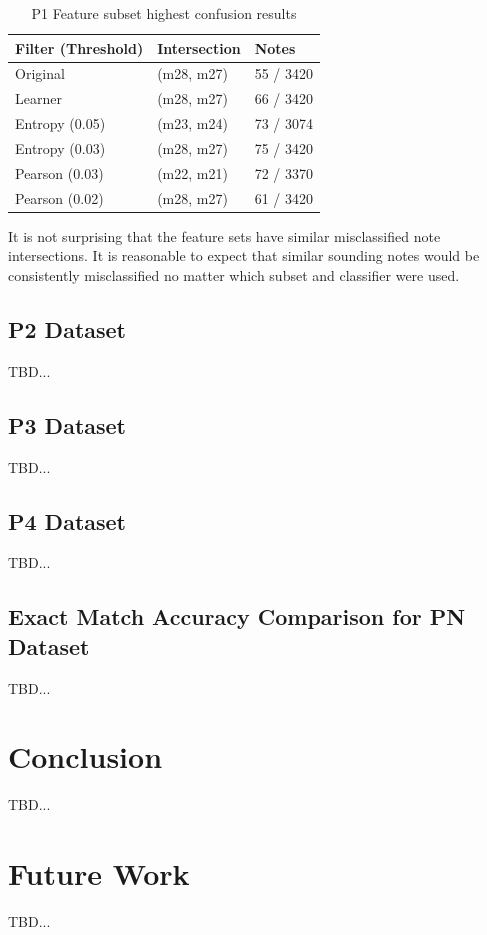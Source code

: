 \documentclass{article}
\begin{document}
\begin{table}[h]
 \begin{center}
  \caption{P1 Feature subset highest confusion results}
\begin{tabular}{|C{2cm}|C{2cm}|C{2cm}|}
      \hline
          Filter (Threshold)& Intersection& Notes \\
         \hline
         Original & (m28, m27)  & 55 / 3420\\
         \hline
         Learner  & (m28, m27)  & 66 / 3420\\
          \hline
         Entropy (0.05) & (m23, m24) &73 / 3074\\
         \hline
         Entropy (0.03)  & (m28, m27)  & 75 / 3420\\
         \hline
         Pearson (0.03) & (m22, m21) & 72 / 3370\\
         \hline
         Pearson (0.02)  & (m28, m27)  & 61 / 3420\\
       \hline
\end{tabular}
\end{center}
 \label{table4}
\end{table}
It is not surprising that the feature sets have similar misclassified note intersections. It is reasonable to expect that similar sounding notes would be consistently misclassified no matter which subset and classifier were used. 


\subsection{P2 Dataset}
TBD...

\subsection{P3 Dataset}
TBD...
\subsection{P4 Dataset}
TBD...
\subsection{Exact Match Accuracy Comparison for PN Dataset}
TBD...
\section{Conclusion}\label{sec:Conclusion}
TBD...
\section{Future Work}
TBD...

\end{document}
